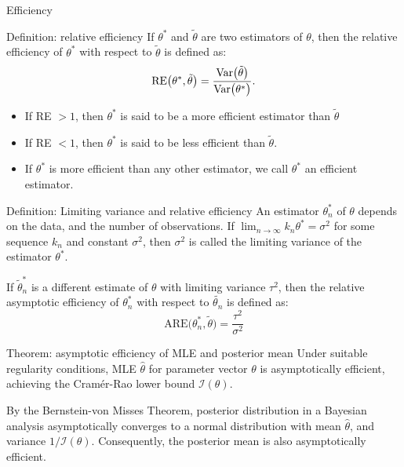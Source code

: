   \begin{frame}[allowframebreaks]{Efficiency}

  \begin{block}{Definition: relative efficiency}
    If $\theta^*$ and $\tilde{\theta}$ are two estimators of $\theta$, then the \alert{relative efficiency} of $\theta^*$ with respect to $\tilde{\theta}$ is defined as:
    $$
    \text{RE}\big(\theta^*, \tilde{\theta}\big) = \frac{\mathrm{Var}\big(\tilde{\theta}\big)}{\mathrm{Var}\big(\theta^*\big)}.
    $$
  \end{block}

  \begin{itemize}
    \item If RE $> 1$, then $\theta^*$ is said to be a more efficient estimator than $\tilde{\theta}$
    \item If RE $< 1$, then $\theta^*$ is said to be less efficient than $\tilde{\theta}$.
    \item If $\theta^*$ is more efficient than any other estimator, we call $\theta^*$ an \alert{efficient estimator}.
  \end{itemize}

  \framebreak

  \begin{block}{Definition: Limiting variance and relative efficiency}
    An estimator $\theta_n^*$ of $\theta$ depends on the data, and the number of observations. If $\lim_{n \rightarrow \infty} k_n \theta^* = \sigma^2$ for some sequence $k_n$ and constant $\sigma^2$, then $\sigma^2$ is called the \alert{limiting variance of the estimator} $\theta^*$.

    If $\tilde{\theta}_n^*$ is a different estimate of $\theta$ with limiting variance $\tau^2$, then the \alert{relative asymptotic efficiency} of $\theta^*_n$ with respect to $\tilde{\theta_n}$ is defined as:
    $$
    \text{ARE}\big(\theta^*_n, \tilde{\theta}\big) = \frac{\tau^2}{\sigma^2}
    $$

  \end{block}

  \framebreak

  \begin{block}{Theorem: asymptotic efficiency of MLE and posterior mean}
    Under suitable regularity conditions, MLE $\hat{\theta}$ for parameter vector $\theta$ is \alert{asymptotically efficient}, achieving the Cram\'er-Rao lower bound $\mathcal{I}(\theta)$.

    By the Bernstein-von Misses Theorem, posterior distribution in a Bayesian analysis asymptotically converges to a normal distribution with mean $\hat{\theta}$, and variance $1/\mathcal{I}(\theta)$. Consequently, the posterior mean is also asymptotically efficient.


\end{block}
\end{frame}
